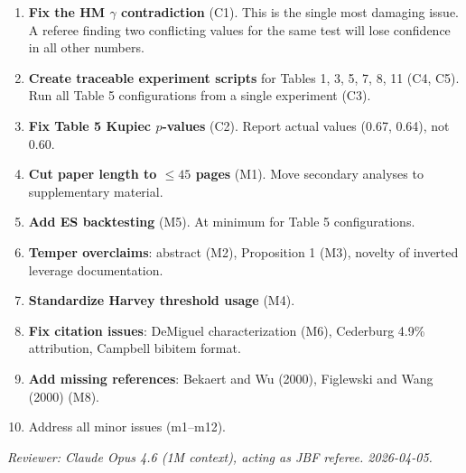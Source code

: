 \documentclass[12pt,a4paper]{article}
\begin{document}
\begin{enumerate}
\item \textbf{Fix the HM $\gamma$ contradiction} (C1). This is the single most damaging issue. A referee finding two conflicting values for the same test will lose confidence in all other numbers.

\item \textbf{Create traceable experiment scripts} for Tables 1, 3, 5, 7, 8, 11 (C4, C5). Run all Table 5 configurations from a single experiment (C3).

\item \textbf{Fix Table 5 Kupiec $p$-values} (C2). Report actual values (0.67, 0.64), not 0.60.

\item \textbf{Cut paper length to $\leq 45$ pages} (M1). Move secondary analyses to supplementary material.

\item \textbf{Add ES backtesting} (M5). At minimum for Table 5 configurations.

\item \textbf{Temper overclaims}: abstract (M2), Proposition 1 (M3), novelty of inverted leverage documentation.

\item \textbf{Standardize Harvey threshold usage} (M4).

\item \textbf{Fix citation issues}: DeMiguel characterization (M6), Cederburg 4.9\% attribution, Campbell bibitem format.

\item \textbf{Add missing references}: Bekaert and Wu (2000), Figlewski and Wang (2000) (M8).

\item Address all minor issues (m1--m12).
\end{enumerate}

\bigskip

\noindent\textit{Reviewer: Claude Opus 4.6 (1M context), acting as JBF referee. 2026-04-05.}
\end{document}
